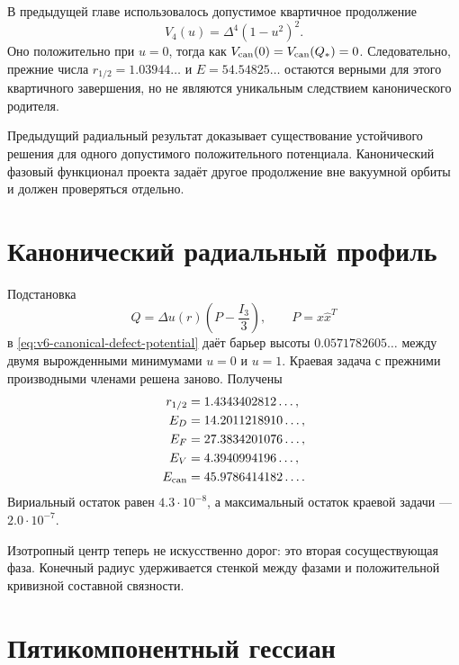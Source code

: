 В предыдущей главе использовалось допустимое квартичное продолжение
\begin{equation}
 V_4(u)=\Delta^4(1-u^2)^2.
\end{equation}
Оно положительно при $u=0$, тогда как
$V_{\rm can}(0)=V_{\rm can}(Q_*)=0$. Следовательно, прежние числа
$r_{1/2}=1.03944\ldots$ и $E=54.54825\ldots$ остаются верными для этого
квартичного завершения, но не являются уникальным следствием
канонического родителя.

\begin{proposition}
Предыдущий радиальный результат доказывает существование устойчивого
решения для одного допустимого положительного потенциала. Канонический
фазовый функционал проекта задаёт другое продолжение вне вакуумной орбиты и
должен проверяться отдельно.
\end{proposition}

\section{Канонический радиальный профиль}

Подстановка
\begin{equation}
 Q=\Delta u(r)\left(P-\frac{I_3}{3}\right),
 \qquad P=\widehat x\widehat x^T
\end{equation}
в \eqref{eq:v6-canonical-defect-potential} даёт барьер высоты
$0.0571782605\ldots$ между двумя вырожденными минимумами $u=0$ и $u=1$.
Краевая задача с прежними производными членами решена заново. Получены
\begin{align}
 r_{1/2}&=1.4343402812\ldots,\\
 E_D&=14.2011218910\ldots,\\
 E_F&=27.3834201076\ldots,\\
 E_V&=4.3940994196\ldots,\\
 E_{\rm can}&=45.9786414182\ldots.
 \label{eq:v6-canonical-radial-result}
\end{align}
Вириальный остаток равен $4.3\cdot10^{-8}$, а максимальный остаток
краевой задачи --- $2.0\cdot10^{-7}$.

Изотропный центр теперь не искусственно дорог: это вторая сосуществующая
фаза. Конечный радиус удерживается стенкой между фазами и положительной
кривизной составной связности.

\section{Пятикомпонентный гессиан}

